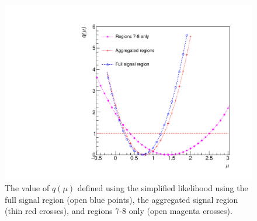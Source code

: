 \begin{figure}[hbt]
  \begin{center} 
   \includegraphics[width=1.5\cmsFigWidth]{figures/r_agg.pdf}
   \caption{The value of $q(\mu)$ defined using the simplified likelihood using the full signal region (open blue points), the aggregated signal region (thin red crosses),
   and regions 7-8 only (open magenta crosses).}
   \label{fig:agg-likelihoodscan} 
  \end{center}
\end{figure}
